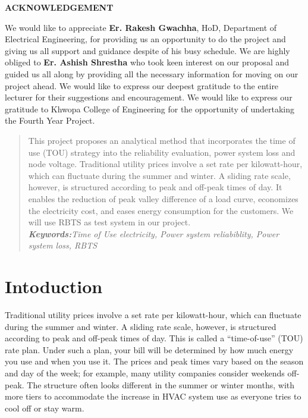 \documentclass[12pt]{article}
\begin{document}
\begin{center}
\textbf{ACKNOWLEDGEMENT}
\end{center}
\bigskip
We would like to appreciate \textbf{Er. Rakesh Gwachha}, HoD, Department of Electrical
Engineering, for providing us an opportunity to do the project and giving us all support and guidance despite of his busy schedule. We are highly obliged to \textbf{ Er. Ashish Shrestha}  who took keen interest on our proposal and guided us all along by providing all the necessary information for moving on our project ahead. We would like to express our deepest gratitude to the entire lecturer for their suggestions and encouragement. We would like to express our gratitude to Khwopa College of Engineering for the opportunity of undertaking the Fourth Year Project.
\pagebreak
\begin{abstract}
\bigskip
This project proposes an analytical method that incorporates the time of use
(TOU) strategy into the reliability evaluation, power system loss and node voltage.
Traditional utility prices involve a set rate per kilowatt-hour, which can fluctuate during the summer and winter. A sliding rate scale, however, is structured
according to peak and off-peak times of day. It enables the reduction of peak valley difference of a load curve, economizes the electricity cost, and eases energy
consumption for the customers. We will use RBTS as test system in our project.\\
\textit{\textbf{Keywords:}Time of Use electricity, Power system reliabiblity, Power system loss,
RBTS}
\end{abstract}
\pagebreak
\tableofcontents
\pagebreak
\listoffigures
\pagebreak
{}
\section{Intoduction}
Traditional utility prices involve a set rate per kilowatt-hour, which can fluctuate
during the summer and winter. A sliding rate scale, however, is structured according to peak and off-peak times of day. This is called a “time-of-use” (TOU) rate
plan. Under such a plan, your bill will be determined by how much energy you use
and when you use it. The prices and peak times vary based on the season and day
of the week; for example, many utility companies consider weekends off-peak.
The structure often looks different in the summer or winter months, with more
tiers to accommodate the increase in HVAC system use as everyone tries to cool
off or stay warm.
\pagebreak
\end{document}
